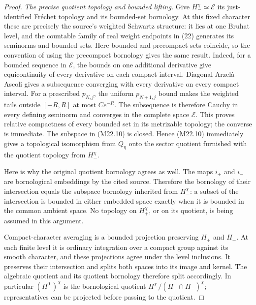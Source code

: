 \begin{proof}
\emph{The precise quotient topology and bounded lifting.}
Give \(H_-^\chi\simeq\mathcal E\) its
just-identified Fr\'echet topology and its
bounded-set bornology.  At this fixed character
these are precisely the source's weighted
Schwartz structure: it lies at one Bruhat
level, and the countable family of real
weight endpoints in (22) generates its
seminorms and bounded sets.
Here bounded and precompact sets coincide,
so the convention of using the precompact
bornology gives the same result.  Indeed,
for a bounded sequence in \(\mathcal E\),
the bounds on one additional derivative
give equicontinuity of every derivative
on each compact interval.  Diagonal
Arzel\`a--Ascoli gives a subsequence
converging with every derivative on every
compact interval.  For a prescribed
\(p_{N,j}\), the uniform \(p_{N+1,j}\)
bound makes the weighted tails outside
\([-R,R]\) at most \(Ce^{-R}\).
The subsequence is therefore Cauchy in
every defining seminorm and converges
in the complete space \(\mathcal E\).
This proves relative compactness of every
bounded set in its metrizable topology;
the converse is immediate.
The subspace in (M22.10) is closed.
Hence (M22.10) immediately gives a
topological isomorphism from \(Q_\eta\)
onto the sector quotient furnished with
the quotient topology from \(H_-^\chi\).

Here is why the original quotient bornology
agrees as well.  The maps \(i_+\) and \(i_-\)
are bornological embeddings by the cited
source.  Therefore the bornology of their
intersection equals the subspace bornology
inherited from \(H_-^\chi\): a subset of the
intersection is bounded in either embedded
space exactly when it is bounded in the
common ambient space.  No topology on
\(H_+^\chi\), or on its quotient, is being
assumed in this argument.

Compact-character averaging is a bounded
projection preserving \(H_+\) and \(H_-\).
At each finite level it is ordinary integration
over a compact group against its smooth
character, and these projections agree under
the level inclusions.
It preserves their intersection and splits
both spaces into its image and kernel.
The algebraic quotient and its quotient
bornology therefore split accordingly.
In particular \((H_-^0)^\chi\) is the
bornological quotient
\(H_-^\chi/(H_+\cap H_-)^\chi\);
representatives can be projected before
passing to the quotient.


\end{proof}
